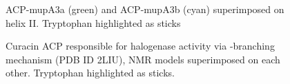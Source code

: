 			\setlength\fboxsep{5pt}
			\setlength\fboxrule{1.5pt}
			\begin{figure}[]
			\centering
			\caption[ACP-mupA3a (green) and ACP-mupA3b (cyan) superimposed on helix II. Tryptophan highlighted as sticks]{ACP-mupA3a (green) and ACP-mupA3b (cyan) superimposed on helix II. Tryptophan highlighted as sticks}
			\label{fig:acp3and4}
			\end{figure}							
			
			\setlength\fboxsep{5pt}
			\setlength\fboxrule{1.5pt}
			\begin{figure}[]
			\centering
			\caption[Curacin ACP responsible for halogenase activity via \bet-branching mechanism (PDB ID 2LIU), NMR models superimposed on each other. Tryptophan highlighted as sticks.]{Curacin ACP responsible for halogenase activity via \bet-branching mechanism (PDB ID 2LIU), NMR models superimposed on each other. Tryptophan highlighted as sticks.}
			\label{fig:2liunmr}
			\end{figure}
	
